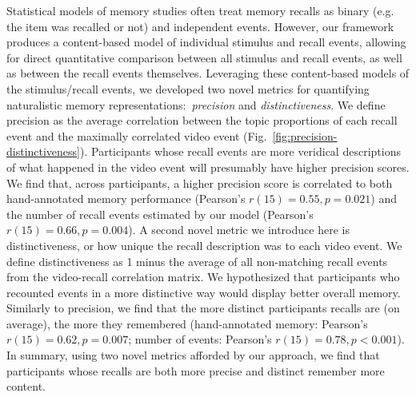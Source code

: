 \documentclass{article}
\begin{document}
Statistical models of memory studies often treat memory recalls as binary (e.g. the item was recalled or not) and independent events.  However, our framework produces a content-based model of individual stimulus and recall events, allowing for direct quantitative comparison between all stimulus and recall events, as well as between the recall events themselves.  Leveraging these content-based models of the stimulus/recall events, we developed two novel metrics for quantifying naturalistic memory representations:~\textit{precision} and \textit{distinctiveness}.  We define precision as the average correlation between the topic proportions of each recall event and the maximally correlated video event (Fig.~\ref{fig:precision-distinctiveness}).  Participants whose recall events are more veridical descriptions of what happened in the video event will presumably have higher precision scores. We find that, across participants, a higher precision score is correlated to both hand-annotated memory performance (Pearson's $r(15) = 0.55, p = 0.021$) and the number of recall events estimated by our model (Pearson's $r(15) = 0.66, p = 0.004$). A second novel metric we introduce here is distinctiveness, or how unique the recall description was to each video event. We define distinctiveness as 1 minus the average of all non-matching recall events from the video-recall correlation matrix. We hypothesized that participants who recounted events in a more distinctive way would display better overall memory.  Similarly to precision, we find that the more distinct participants recalls are (on average), the more they remembered (hand-annotated memory: Pearson's $r(15) = 0.62, p = 0.007$; number of events: Pearson's $r(15) = 0.78, p < 0.001$).  In summary, using two novel metrics afforded by our approach, we find that participants whose recalls are both more precise and distinct remember more content.
\end{document}
